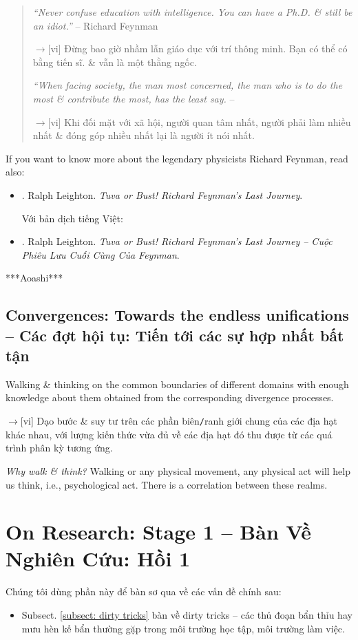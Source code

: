 \documentclass[12pt,oneside]{book}
\begin{document}
\begin{quotation}
	{\it``Never confuse education with intelligence. You can have a Ph.D. \& still be an idiot.''} -- {\sc Richard Feynman}
	
	{\sf[en]$\to$[vi]} Đừng bao giờ nhầm lẫn giáo dục với trí thông minh. Bạn có thể có bằng tiến sĩ. \& vẫn là một thằng ngốc.	
	
	{\it``When facing society, the man most concerned, the man who is to do the most \& contribute the most, has the least say.} -- \cite{Rand_fountainhead}
	
	{\sf[en]$\to$[vi]} Khi đối mặt với xã hội, người quan tâm nhất, người phải làm nhiều nhất \& đóng góp nhiều nhất lại là người ít nói nhất.
\end{quotation}
If you want to know more about the legendary physicists {\sc Richard Feynman}, read also:
\begin{itemize}
	\item \cite{Leighton_Feyman_last_journey}. {\sc Ralph Leighton}. {\it Tuva or Bust! Richard Feynman's Last Journey}.
	
	Với bản dịch tiếng Việt:
	\item \cite{Leighton_Feyman_last_journey_VN}. {\sc Ralph Leighton}. {\it Tuva or Bust! Richard Feynman's Last Journey -- Cuộc Phiêu Lưu Cuối Cùng Của Feynman}.
\end{itemize}


***Aoashi***

\section{Convergences: Towards the endless unifications -- Các đợt hội tụ: Tiến tới các sự hợp nhất bất tận}
Walking \& thinking on the common boundaries of different domains with enough knowledge about them obtained from the corresponding divergence processes.

{\sf[en]$\to$[vi]} Dạo bước \& suy tư trên các phần biên{\tt/}ranh giới chung của các địa hạt khác nhau, với lượng kiến thức vừa đủ về các địa hạt đó thu được từ các quá trình phân kỳ tương ứng.

{\it Why walk \& think?} Walking or any physical movement, any physical act will help us think, i.e., psychological act. There is a correlation between these realms.


\chapter{On Research: Stage 1 -- Bàn Về Nghiên Cứu: Hồi 1}
\label{sect: research stage 1}
\minitoc
Chúng tôi dùng phần này để bàn sơ qua về các vấn đề chính sau:
\begin{itemize}
	\item Subsect. \ref{subsect: dirty tricks} bàn về dirty tricks -- các thủ đoạn bẩn thỉu hay mưu hèn kế bẩn thường gặp trong môi trường học tập, môi trường làm việc.
\end{itemize}
\end{document}
